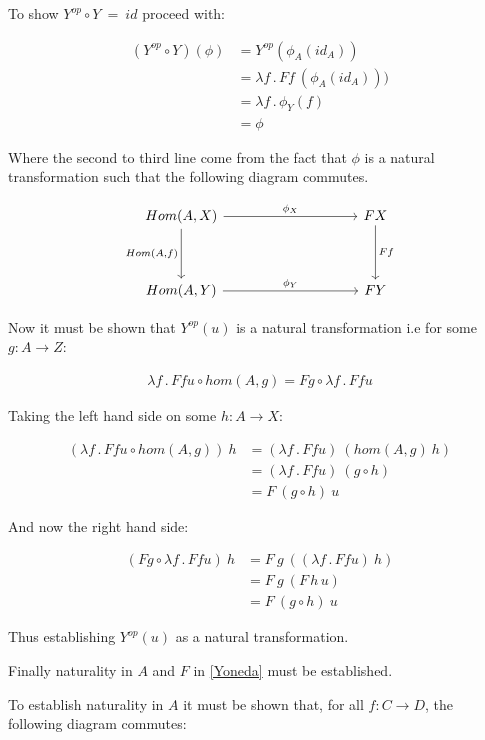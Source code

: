 \documentclass[a4paper,12pt]{article}
\begin{document}
To show $Y^{op} \circ Y \ = \ id$ proceed with:

\begin{align*}
    (Y^{op} \circ Y) (\phi) &= Y^{op} (\phi_{A}(id_{A})) \\
    &= \lambda f \, . \, F f \ (\phi_{A}( id_{A}))) \\
    &= \lambda f \, . \, \phi_{Y}(f) \\
    &= \phi
\end{align*}


Where the second to third line come from the fact that $\phi$ is a natural
transformation such that the following diagram commutes.

\[\begin{tikzcd}[sep=huge]
    {Hom(A, X)} \arrow[d, "{Hom(A,f)}"'] \arrow[rr, "\phi_{X}"] &  & FX
    \arrow[d, "Ff"] \\
    {Hom(A,Y)} \arrow[rr, "\phi_{Y}"] &  & FY
\end{tikzcd}\]

Now it must be shown that $Y^{op}(u)$ is a natural transformation i.e for some
$g: A \rightarrow Z$: 

\begin{align*}
    \lambda f \, . \, F f u  \circ hom(A, g) = F g \circ \lambda f \, . \, F f u
\end{align*}

Taking the left hand side on some $h: A \rightarrow X$:

\begin{align*}
    (\lambda f \, . \, F f u  \circ hom(A, g)) \ h &= (\lambda f \, . \, F f u) \ (
    hom(A, g) \ h) \\
    &= (\lambda f \, . \, F f u) \ (g \circ h) \\
    &=  F \ (g \circ h) \ u
\end{align*}

And now the right hand side:

\begin{align*}
    (F g \circ \lambda f \, . \, F f u) \ h &= F \ g \ ( (\lambda f \, . \, F f
        u) \
    h) \\
    &= F \ g \ (F \, h \, u) \\
    &= F \ (g \circ h) \ u
\end{align*}

Thus establishing $Y^{op}(u)$ as a natural transformation.

Finally naturality in $A$ and $F$ in \ref{Yoneda} must be established.

To establish naturality in $A$ it must be shown that, for all $f: C \rightarrow D$, the
following diagram commutes:
\end{document}
